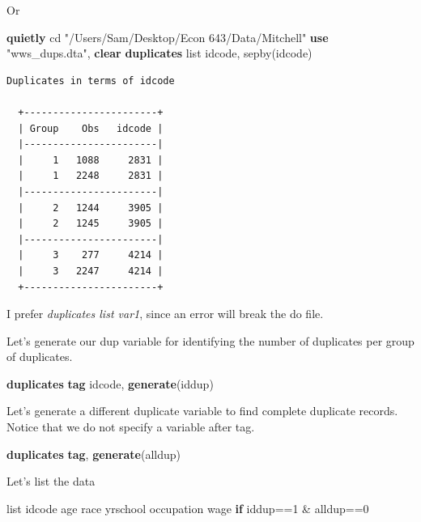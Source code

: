 \documentclass[
]{book}
\newenvironment{Shaded}{\begin{snugshade}}{\end{snugshade}}
\newcommand{\FunctionTok}[1]{\textcolor[rgb]{0.13,0.29,0.53}{\textbf{#1}}}
\newcommand{\KeywordTok}[1]{\textcolor[rgb]{0.13,0.29,0.53}{\textbf{#1}}}
\newcommand{\NormalTok}[1]{#1}
\newcommand{\OtherTok}[1]{\textcolor[rgb]{0.56,0.35,0.01}{#1}}
\newcommand{\StringTok}[1]{\textcolor[rgb]{0.31,0.60,0.02}{#1}}
\begin{document}
Or

\begin{Shaded}
\begin{Highlighting}[]
\KeywordTok{quietly}\NormalTok{ cd }\StringTok{"/Users/Sam/Desktop/Econ 643/Data/Mitchell"}
\KeywordTok{use} \StringTok{"wws\_dups.dta"}\NormalTok{, }\KeywordTok{clear}
\KeywordTok{duplicates} \OtherTok{list}\NormalTok{ idcode, sepby(idcode)}
\end{Highlighting}
\end{Shaded}

\begin{verbatim}
Duplicates in terms of idcode

  +-----------------------+
  | Group    Obs   idcode |
  |-----------------------|
  |     1   1088     2831 |
  |     1   2248     2831 |
  |-----------------------|
  |     2   1244     3905 |
  |     2   1245     3905 |
  |-----------------------|
  |     3    277     4214 |
  |     3   2247     4214 |
  +-----------------------+
\end{verbatim}

I prefer \emph{duplicates list var1}, since an error will break the do file.

Let's generate our dup variable for identifying the number of duplicates per
group of duplicates.

\begin{Shaded}
\begin{Highlighting}[]
\KeywordTok{duplicates} \FunctionTok{tag}\NormalTok{ idcode, }\KeywordTok{generate}\NormalTok{(iddup)}
\end{Highlighting}
\end{Shaded}

Let's generate a different duplicate variable to find complete duplicate
records. Notice that we do not specify a variable after tag.

\begin{Shaded}
\begin{Highlighting}[]
\KeywordTok{duplicates} \FunctionTok{tag}\NormalTok{, }\KeywordTok{generate}\NormalTok{(alldup)}
\end{Highlighting}
\end{Shaded}

Let's list the data

\begin{Shaded}
\begin{Highlighting}[]
\OtherTok{list}\NormalTok{ idcode age race yrschool occupation wage }\KeywordTok{if}\NormalTok{ iddup==1 \& alldup==0}
\end{Highlighting}
\end{Shaded}
\end{document}
